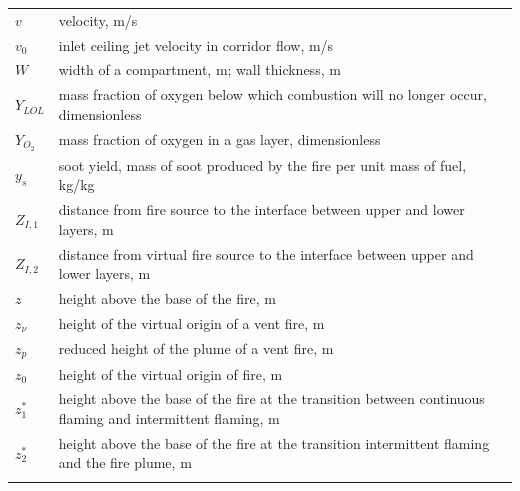 \documentclass[12pt]{book}
\begin{document}
\begin{center}
\begin{longtable}{p{1in}  p{5.5 in}}
 $v$ & velocity, m/s \\
 $v_0$ & inlet ceiling jet velocity in corridor flow, m/s \\
 $W$ & width of a compartment, m; wall thickness, m \\
 $Y_{LOL}$ & mass fraction of oxygen below which combustion will no longer occur, dimensionless \\
 $Y_{O_2}$ & mass fraction of oxygen in a gas layer, dimensionless \\
 $y_s$ &  soot yield, mass of soot produced by the fire per unit mass of fuel, kg/kg \\
 $Z_{I,1}$ & distance from fire source to the interface between upper and lower layers, m \\
 $Z_{I,2}$ & distance from virtual fire source to the interface between upper and lower layers, m \\
 $z$ & height above the base of the fire, m \\
 $z_{\nu}$ & height of the virtual origin of a vent fire, m \\
 $z_p$ & reduced height of the plume of a vent fire, m \\
 $z_0$ & height of the virtual origin of fire, m \\
 $z_1^*$ & height above the base of the fire at the transition between continuous flaming and intermittent flaming, m \\
 $z_2^*$ & height above the base of the fire at the transition intermittent flaming and the fire plume, m \\
  \\


\end{longtable}
\end{center}
\end{document}
